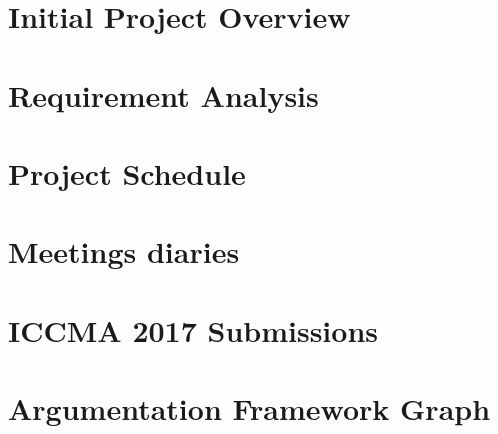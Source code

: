 \documentclass[12pt,a4paper]{report}
\theoremstyle{definition}
\begin{document}
\begin{appendices}
\chapter{Initial Project Overview}
\label{appendix:IPO}


\chapter{Requirement Analysis} 
\label{appendix:requirementAnalysis}


\chapter{Project Schedule}
\label{appendix:projectSchedule}


\chapter{Meetings diaries}
\label{appendix:diaries}


\chapter{ICCMA 2017 Submissions}
\label{appendix:ICCMASubmissions}


\chapter{Argumentation Framework Graph}
\label{appendix:aficcma}





\end{appendices}
\end{document}
